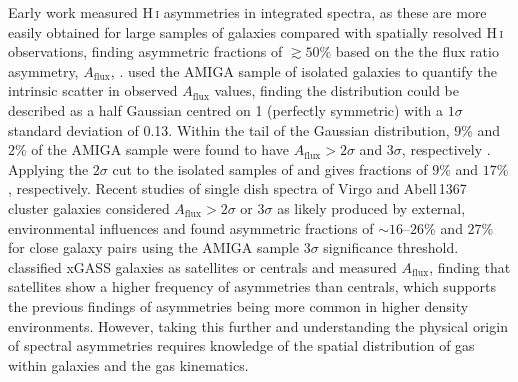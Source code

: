 \documentclass[fleqn,usenatbib]{mnras}
\begin{document}
Early work measured H\,\textsc{i} asymmetries in integrated spectra, as these are more easily obtained for large samples of galaxies compared with spatially resolved H\,\textsc{i} observations, finding asymmetric fractions of $\gtrsim50\%$ based on the the flux ratio asymmetry, $A_{\mathrm{flux}}$, \citep[the ratio of the integrated flux of the two halves of the spectrum divided at the systemic velocity,][]{Richter1994,Haynes1998,Matthews1998}. \cite{Espada2011} used the AMIGA \citep[Analysis of the interstellar Medium in Isolated GAlaxies,][]{VerdesMontenegro2005} sample of isolated galaxies to quantify the intrinsic scatter in observed $A_{\mathrm{flux}}$ values, finding the distribution could be described as a half Gaussian centred on 1 (perfectly symmetric) with a $1\sigma$ standard deviation of 0.13. Within the tail of the Gaussian distribution, $9\%$ and $2\%$ of the AMIGA sample were found to have $A_{\mathrm{flux}}>2\sigma$ and $3\sigma$, respectively \citep{Espada2011}. Applying the $2\sigma$ cut to the isolated samples of \cite{Haynes1998} and \cite{Matthews1998} gives fractions of $9\%$ and $17\%$, respectively. Recent studies of single dish spectra of Virgo and Abell\,1367 cluster galaxies considered $A_{\mathrm{flux}}>2\sigma$ or $3\sigma$ as likely produced by external, environmental influences and found asymmetric fractions of $\sim16$--$26\%$ \citep{Scott2018} and $27\%$ for close galaxy pairs \citep{Bok2018} using the AMIGA sample $3\sigma$ significance threshold. \cite{Watts2020} classified xGASS \citep{Catinella2018} galaxies as satellites or centrals and measured $A_{\mathrm{flux}}$, finding that satellites show a higher frequency of asymmetries than centrals, which supports the previous findings of asymmetries being more common in higher density environments. However, taking this further and understanding the physical origin of spectral asymmetries requires knowledge of the spatial distribution of gas within galaxies and the gas kinematics. 
\end{document}
